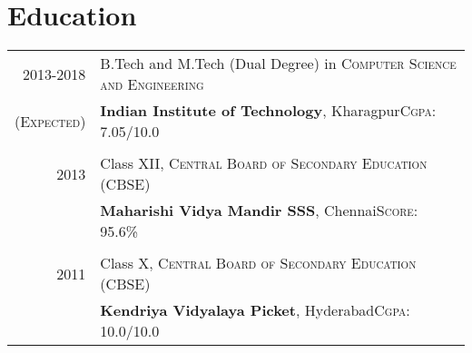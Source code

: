 \documentclass[a4paper,10pt]{extarticle} %
\begin{document}



\section{Education}

\begin{tabular}{r|p{16cm}}	
2013-2018 & B.Tech and M.Tech (Dual Degree) in \textsc{Computer Science and Engineering}\\
\textsc{(Expected)}&\textbf{Indian Institute of Technology}, Kharagpur\hfill\textsc{Cgpa}: 7.05/10.0\\
&\\


2013& Class XII, \textsc{}\textsc{Central Board of Secondary Education (CBSE)} \\
&\normalsize\textbf{Maharishi Vidya Mandir SSS}, Chennai\hfill\textsc{Score}: 95.6\%\\
&\\


2011 & Class X, \textsc{}\textsc{Central Board of Secondary Education (CBSE)} \\
&\normalsize\textbf{Kendriya Vidyalaya Picket}, Hyderabad\hfill\textsc{Cgpa}: 10.0/10.0\\

\end{tabular}

\end{document}
